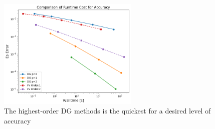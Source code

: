 \documentclass{article}
\begin{document}
\begin{figure}[H]
	\centering
	\includegraphics[width=0.60\textwidth,keepaspectratio]{comp_walltime.png}
	\caption{The highest-order DG methods is the quickest for a desired level of accuracy}
	\label{fig:comp_walltime}
\end{figure}




% 
\end{document}
